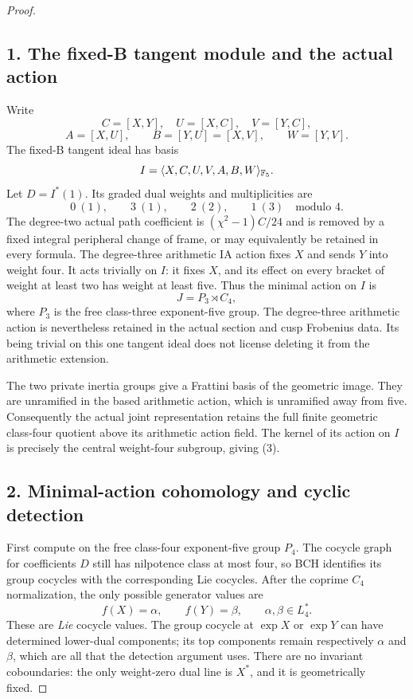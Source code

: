 \documentclass[11pt]{article}
\begin{document}
\begin{proof}
\subsection*{1. The fixed-B tangent module and the actual action}
Write
\[
 C=[X,Y],\quad U=[X,C],\quad V=[Y,C],
\]
\[
 A=[X,U],\qquad B=[Y,U]=[X,V],\qquad W=[Y,V].
\]
The fixed-B tangent ideal has basis
\[
 I=\langle X,C,U,V,A,B,W\rangle_{\mathbb F_5}.
\]
Let $D=I^*(1)$. Its graded dual weights and multiplicities are
\[
 0\ (1),\qquad 3\ (1),\qquad 2\ (2),\qquad 1\ (3)
 \quad\text{modulo }4.
 \tag{2}
\]
The degree-two actual path coefficient is $(\chi^2-1)C/24$ and is removed by a fixed integral peripheral change of frame, or may equivalently be retained in every formula. The degree-three arithmetic IA action fixes $X$ and sends $Y$ into weight four. It acts trivially on $I$: it fixes $X$, and its effect on every bracket of weight at least two has weight at least five. Thus the minimal action on $I$ is
\[
 J=P_3\rtimes C_4,
 \tag{3}
\]
where $P_3$ is the free class-three exponent-five group. The degree-three arithmetic action is nevertheless retained in the actual section and cusp Frobenius data. Its being trivial on this one tangent ideal does not license deleting it from the arithmetic extension.

The two private inertia groups give a Frattini basis of the geometric image. They are unramified in the based arithmetic action, which is unramified away from five. Consequently the actual joint representation retains the full finite geometric class-four quotient above its arithmetic action field. The kernel of its action on $I$ is precisely the central weight-four subgroup, giving (3).

\subsection*{2. Minimal-action cohomology and cyclic detection}
First compute on the free class-four exponent-five group $P_4$. The cocycle graph for coefficients $D$ still has nilpotence class at most four, so BCH identifies its group cocycles with the corresponding Lie cocycles. After the coprime $C_4$ normalization, the only possible generator values are
\[
 f(X)=\alpha,\qquad f(Y)=\beta,
 \qquad \alpha,\beta\in L_4^*.
 \tag{4}
\]
These are \emph{Lie} cocycle values. The group cocycle at $\exp X$ or $\exp Y$ can have determined lower-dual components; its top components remain respectively $\alpha$ and $\beta$, which are all that the detection argument uses. There are no invariant coboundaries: the only weight-zero dual line is $X^*$, and it is geometrically fixed.


\end{proof}
\end{document}
